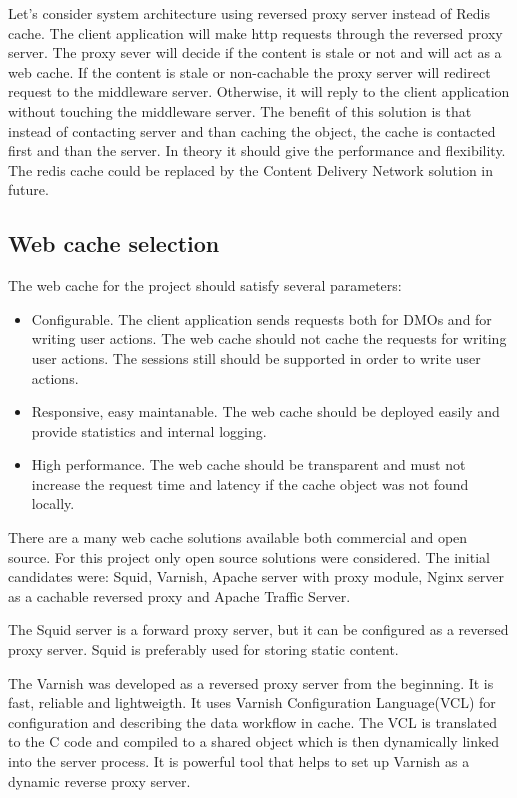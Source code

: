 Let’s consider system architecture using reversed proxy server instead of Redis cache. The client application will make http requests through the reversed proxy server. The proxy sever will decide if the content is stale or not and will act as a web cache. If the content is stale or non-cachable the proxy server will redirect request to the middleware server. Otherwise, it will reply to the client application without touching the middleware server. The benefit of this solution is that instead of contacting server and than caching the object, the cache is contacted first and than the server. In theory it should give the performance and flexibility. The redis cache could be replaced by the Content Delivery Network solution in future.


\subsection{Web cache selection}

The web cache for the project should satisfy several parameters:
\begin{itemize}
	\item Configurable. The client application sends requests both for DMOs and for writing user actions. The web cache should not cache the requests for writing user actions. The sessions still should be supported in order to write user actions. 
	\item Responsive, easy maintanable. The web cache should be deployed easily and provide statistics and internal logging. 
	\item High performance. The web cache should be transparent and must not increase the request time and latency if the cache object was not found locally. 
\end{itemize}

There are a many web cache solutions available both commercial and open source. For this project only open source solutions were considered. The initial candidates were: Squid, Varnish, Apache server with proxy module, Nginx server as a cachable reversed proxy and Apache Traffic Server.

The Squid server is a forward proxy server, but it can be configured as a reversed proxy server. Squid is preferably used for storing static content.

The Varnish was developed as a reversed proxy server from the beginning. It is fast, reliable and lightweigth. It uses Varnish Configuration Language(VCL) for configuration and describing the data workflow in cache. The VCL is translated to the C code and compiled to a shared object which is then dynamically linked into the server process. It is powerful tool that helps to set up Varnish as a dynamic reverse proxy server.

